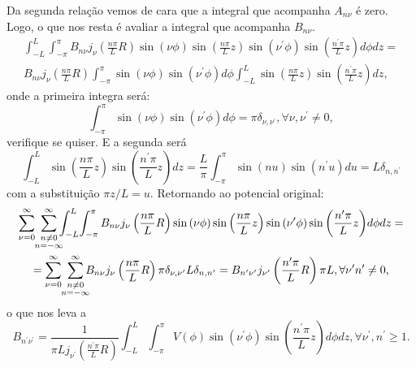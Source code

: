 \documentclass{article}
\begin{document}
Da segunda relação vemos de cara que a integral que acompanha $A_{n \nu}$ é zero. Logo, o que nos resta é avaliar a integral que acompanha $B_{n \nu}$.
\begin{multline}
 \int_{-L}^{L} \!  \int_{-\pi}^{\pi}
 B_{n \nu} j_{\nu}\left( \frac{n \pi}{L} R \right) \sin{(\nu \phi)} \sin{\left( \frac{n \pi}{L}z \right)} \sin{(\nu^{\prime} \phi)}
 \sin{\left( \frac{n^{\prime} \pi}{L}z \right)} d\phi dz = \\
 B_{n \nu} j_{\nu}\left( \frac{n \pi}{L} R \right)
 \int_{-\pi}^{\pi}
 \sin{(\nu \phi)}\sin{(\nu^{\prime} \phi)} d\phi \int_{-L}^{L}\sin{\left( \frac{n \pi}{L}z \right)}\sin{\left( \frac{n^{\prime} \pi}{L}z \right)}
  dz\mathrm{,}
\end{multline}
onde a primeira integra será:
\begin{equation}
 \int_{-\pi}^{\pi} \sin{(\nu \phi)}\sin{(\nu^{\prime} \phi)} d\phi = \pi \delta_{\nu,\nu^{\prime}}, \forall \nu, \nu^{\prime} \neq 0\mathrm{,}
\end{equation}
verifique se quiser. E a segunda será
\begin{equation}
 \int_{-L}^{L}\sin{\left( \frac{n \pi}{L}z \right)}\sin{\left( \frac{n^{\prime} \pi}{L}z \right)} dz =
 \frac{L}{\pi} \int_{-\pi}^{\pi}\sin{\left( n u \right) }\sin{\left( n^{\prime}u \right)} du = L \delta_{n, n^{\prime}}
\end{equation}
com a substituição $\pi z \slash L = u$. Retornando ao potencial original:
\begin{multline}
 \sum_{\nu = 0}^{\infty} \ \sum_{\mathclap{\substack{n \neq 0 \\ n = -\infty}}}^{\infty}
 \int_{-L}^{L} \!  \int_{-\pi}^{\pi}
 B_{n \nu} j_{\nu}\left( \frac{n \pi}{L} R \right) \sin{(\nu \phi)} \sin{\left( \frac{n \pi}{L}z \right)} \sin{(\nu^{\prime} \phi)}
 \sin{\left( \frac{n^{\prime} \pi}{L}z \right)} d\phi dz = \\
 = \sum_{\nu = 0}^{\infty} \ \sum_{\mathclap{\substack{n \neq 0 \\ n = -\infty}}}^{\infty} B_{n \nu} j_{\nu}\left( \frac{n \pi}{L} R \right)
 \pi \delta_{\nu,\nu^{\prime}} L \delta_{n, n^{\prime}} = B_{n^{\prime} \nu^{\prime}} j_{\nu^{\prime}}\left( \frac{n^{\prime} \pi}{L} R \right) \pi L, \forall
 \nu^{\prime} n^{\prime} \neq 0\mathrm{,}
\end{multline}
o que nos leva a
\begin{equation}
 B_{n^{\prime} \nu^{\prime}} = \frac{1}{\pi L j_{\nu^{\prime}}\left( \frac{n^{\prime} \pi}{L} R \right)}\int_{-L}^{L} \!  \int_{-\pi}^{\pi}
 V(\phi) \sin{(\nu^{\prime} \phi)} \sin{\left( \frac{n^{\prime} \pi}{L}z \right)} d\phi dz, \forall \nu^{\prime}, n^{\prime} \geq 1 \mathrm{.}
\end{equation}
\end{document}
